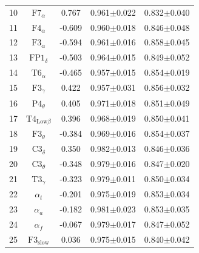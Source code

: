 \documentclass[pdflatex,sn-mathphys]{sn-jnl}%
\theoremstyle{thmstyleone}%
\theoremstyle{thmstyletwo}%
\theoremstyle{thmstylethree}%
\begin{document}
\begin{table}[h!]
\begin{tabular}{r|cccc}
  10 &          $\text{F7}_{\alpha}$ &  0.767 &          0.961$\pm$0.022 &          0.832$\pm$0.040 \\
  11 &          $\text{F4}_{\alpha}$ & -0.609 &          0.960$\pm$0.018 &          0.846$\pm$0.048 \\
  12 &          $\text{F3}_{\alpha}$ & -0.594 &          0.961$\pm$0.016 &          0.858$\pm$0.045 \\
  13 &         $\text{FP1}_{\delta}$ & -0.503 &          0.964$\pm$0.015 &          0.849$\pm$0.052 \\
  14 &          $\text{T6}_{\alpha}$ & -0.465 &          0.957$\pm$0.015 &          0.854$\pm$0.019 \\
  15 &          $\text{F3}_{\gamma}$ &  0.422 &          0.957$\pm$0.031 &          0.856$\pm$0.032 \\
  16 &          $\text{P4}_{\theta}$ &  0.405 &          0.971$\pm$0.018 &          0.851$\pm$0.049 \\
  17 & $\text{T4}_{\text{Low}\beta}$ &  0.396 &          0.968$\pm$0.019 &          0.850$\pm$0.041 \\
  18 &          $\text{F3}_{\theta}$ & -0.384 &          0.969$\pm$0.016 &          0.854$\pm$0.037 \\
  19 &          $\text{C3}_{\delta}$ &  0.350 &          0.982$\pm$0.013 &          0.846$\pm$0.036 \\
  20 &          $\text{C3}_{\theta}$ & -0.348 &          0.979$\pm$0.016 &          0.847$\pm$0.020 \\
  21 &          $\text{T3}_{\gamma}$ & -0.323 &          0.979$\pm$0.011 &          0.850$\pm$0.034 \\
  22 &                  $\alpha_{t}$ & -0.201 &          0.975$\pm$0.019 &          0.853$\pm$0.034 \\
  23 &                  $\alpha_{a}$ & -0.182 &          0.981$\pm$0.023 &          0.853$\pm$0.035 \\
  24 &                  $\alpha_{f}$ & -0.067 &          0.979$\pm$0.017 &          0.847$\pm$0.052 \\
  25 &       $\text{F3}_\text{slow}$ &  0.036 &          0.975$\pm$0.015 &          0.840$\pm$0.042 \\
\hline
\end{tabular}
\end{table}
\end{document}
